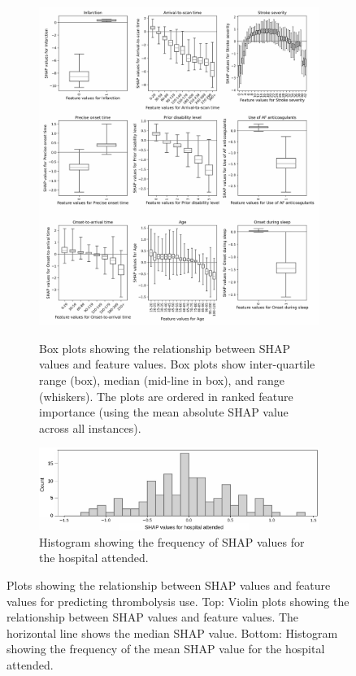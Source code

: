 \begin{figure}
    \centering
    \begin{subfigure}{0.8\textwidth}
      \centering
      \captionsetup{width=.9\linewidth}
      \includegraphics[trim={0 0 0 1.2cm}, clip, width=0.95\linewidth]      {images/p2_patient_shap.jpg}\\
        \caption{Box plots showing the relationship between SHAP values and feature values. Box plots show inter-quartile range (box), median (mid-line in box), and range (whiskers). The plots are ordered in ranked feature importance (using the mean absolute SHAP value across all instances).}
        \label{fig:global_shap}
    \end{subfigure}
    \hfill
    \begin{subfigure}{0.8\textwidth}
      \centering
      \captionsetup{width=.9\linewidth}
      \includegraphics[trim={0 0 0 0.1cm}, clip, width=1\linewidth]    {images/p2_hosp_shap.jpg}
    \caption{Histogram showing the frequency of SHAP values for the hospital attended.}
    \label{fig:hospital_shap}
    \end{subfigure}

  \caption{Plots showing the relationship between SHAP values and feature values for predicting thrombolysis use. Top: Violin plots showing the relationship between SHAP values and feature values. The horizontal line shows the median SHAP value. Bottom: Histogram showing the frequency of the mean SHAP value for the hospital attended.}
    \label{fig:shap_outcome_model}
\end{figure}
